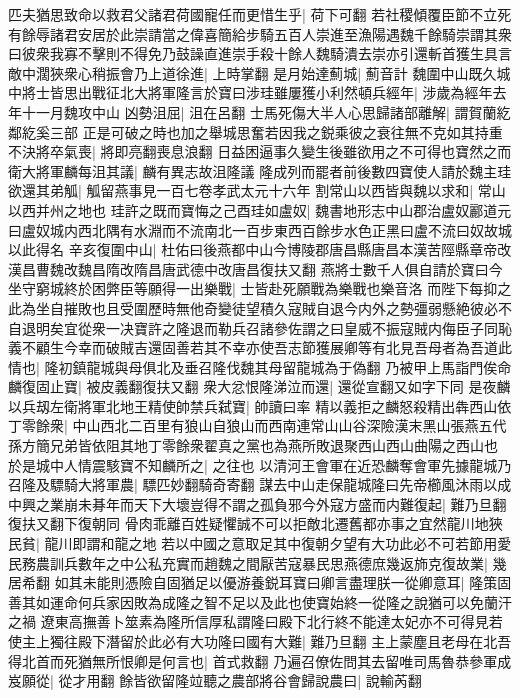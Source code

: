 匹夫猶思致命以救君父諸君荷國寵任而更惜生乎|{
	荷下可翻}
若社稷傾覆臣節不立死有餘辱諸君安居於此崇請當之偉喜簡給步騎五百人崇進至漁陽遇魏千餘騎崇謂其衆曰彼衆我寡不擊則不得免乃鼓譟直進崇手殺十餘人魏騎潰去崇亦引還斬首獲生具言敵中濶狹衆心稍振會乃上道徐進|{
	上時掌翻}
是月始達薊城|{
	薊音計}
魏圍中山既久城中將士皆思出戰征北大將軍隆言於寶曰涉珪雖屢獲小利然頓兵經年|{
	涉歲為經年去年十一月魏攻中山}
凶勢沮屈|{
	沮在呂翻}
士馬死傷大半人心思歸諸部離解|{
	謂賀蘭紇鄰紇奚三部}
正是可破之時也加之舉城思奮若因我之鋭乘彼之衰往無不克如其持重不決將卒氣喪|{
	將即亮翻喪息浪翻}
日益困逼事久變生後雖欲用之不可得也寶然之而衛大將軍麟每沮其議|{
	麟有異志故沮隆議}
隆成列而罷者前後數四寶使人請於魏主珪欲還其弟觚|{
	觚留燕事見一百七卷孝武太元十六年}
割常山以西皆與魏以求和|{
	常山以西并州之地也}
珪許之既而寶悔之己酉珪如盧奴|{
	魏書地形志中山郡治盧奴酈道元曰盧奴城内西北隅有水淵而不流南北一百步東西百餘步水色正黑曰盧不流曰奴故城以此得名}
辛亥復圍中山|{
	杜佑曰後燕都中山今博陵郡唐昌縣唐昌本漢苦陘縣章帝改漢昌曹魏改魏昌隋改隋昌唐武德中改唐昌復扶又翻}
燕將士數千人俱自請於寶曰今坐守窮城終於困弊臣等願得一出樂戰|{
	士皆赴死願戰為樂戰也樂音洛}
而陛下每抑之此為坐自摧敗也且受圍歷時無他奇變徒望積久寇賊自退今内外之勢彊弱懸絶彼必不自退明矣宜從衆一决寶許之隆退而勒兵召諸參佐謂之曰皇威不振寇賊内侮臣子同恥義不顧生今幸而破賊吉還固善若其不幸亦使吾志節獲展卿等有北見吾母者為吾道此情也|{
	隆初鎮龍城與母俱北及垂召隆伐魏其母留龍城為于偽翻}
乃被甲上馬詣門俟命麟復固止寶|{
	被皮義翻復扶又翻}
衆大忿恨隆涕泣而還|{
	還從宣翻又如字下同}
是夜麟以兵刼左衛將軍北地王精使帥禁兵弑寶|{
	帥讀曰率}
精以義拒之麟怒殺精出犇西山依丁零餘衆|{
	中山西北二百里有狼山自狼山而西南連常山山谷深險漢末黑山張燕五代孫方簡兄弟皆依阻其地丁零餘衆翟真之黨也為燕所敗退聚西山西山曲陽之西山也}
於是城中人情震駭寶不知麟所之|{
	之往也}
以清河王會軍在近恐麟奪會軍先據龍城乃召隆及驃騎大將軍農|{
	驃匹妙翻騎奇寄翻}
謀去中山走保龍城隆曰先帝櫛風沐雨以成中興之業崩未朞年而天下大壞豈得不謂之孤負邪今外寇方盛而内難復起|{
	難乃旦翻復扶又翻下復朝同}
骨肉乖離百姓疑懼誠不可以拒敵北遷舊都亦事之宜然龍川地狹民貧|{
	龍川即謂和龍之地}
若以中國之意取足其中復朝夕望有大功此必不可若節用愛民務農訓兵數年之中公私充實而趙魏之間厭苦寇暴民思燕德庶幾返斾克復故業|{
	幾居希翻}
如其未能則憑險自固猶足以優游養鋭耳寶曰卿言盡理朕一從卿意耳|{
	隆策固善其如運命何兵家因敗為成隆之智不足以及此也使寶始終一從隆之說猶可以免蘭汗之禍}
遼東高撫善卜筮素為隆所信厚私謂隆曰殿下北行終不能達太妃亦不可得見若使主上獨往殿下潛留於此必有大功隆曰國有大難|{
	難乃旦翻}
主上蒙塵且老母在北吾得北首而死猶無所恨卿是何言也|{
	首式救翻}
乃遍召僚佐問其去留唯司馬魯恭參軍成岌願從|{
	從才用翻}
餘皆欲留隆竝聽之農部將谷會歸說農曰|{
	說輸芮翻}
